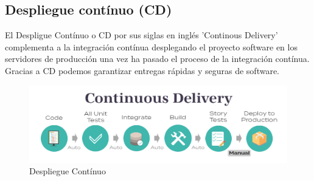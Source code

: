 	\subsection{Despliegue contínuo (CD)}
		\begin{paragraph}
			El Despligue Contínuo o CD por sus siglas en inglés 'Continous Delivery' complementa a la integración contínua desplegando el proyecto software en los servidores de producción una vez ha pasado el proceso de la integración contínua. Gracias a CD podemos garantizar entregas rápidas y seguras de software.
			
			\begin{figure}[!hbt]
				\centering
				\includegraphics[scale=0.35]{imagenes/Introduccion/Conceptos_Basicos/CD.png}
				\caption[Despliegue Contínuo]{Despliegue Contínuo \cite{continuo84:online}}
				\label{despligue_continuo} 
			\end{figure}
		\end{paragraph}

